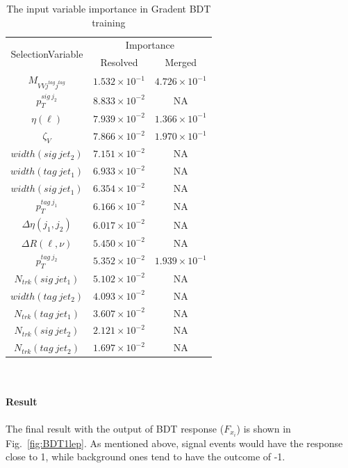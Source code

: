 \begin{table}[h]
	\begin{center}
        \caption{The input variable importance in Gradent BDT training}
		\label{Tab:BDTinput1lepranking}
		\begin{tabular}{|c|c|c|} \hline
		    \multirow{2}{*}{SelectionVariable} & \multicolumn{2}{c|}{Importance}  \\
		    \cline{2-3}
                     &Resolved &  Merged  \\\hline
			$M_{VVj^{tag}j^{tag}}$ & $1.532\times10^{-1}$  & $4.726\times10^{-1}$\\\hline
			$p^{sig\ j_{2}}_{T}$ & $8.833\times10^{-2}$ & NA \\\hline
			$\eta(\ell)$ & $7.939\times10^{-2}$ & $1.366\times10^{-1}$ \\\hline
			$\zeta_{V}$ & $7.866\times10^{-2}$ & $1.970\times10^{-1}$ \\\hline
			$width(sig\ jet_{2})$ & $7.151\times10^{-2}$ & NA \\\hline
			$width(tag\ jet_{1})$ & $6.933\times10^{-2}$ & NA \\\hline
			$width(sig\ jet_{1})$ & $6.354\times10^{-2}$ & NA \\\hline
			$p^{tag\ j_{1}}_{T}$ & $6.166\times10^{-2}$  & NA \\\hline
			$\Delta\eta (j_{1}, j_{2})$ & $6.017\times10^{-2}$ & NA\\\hline
			$\Delta R (\ell,\nu)$ & $5.450\times10^{-2}$ & NA\\\hline
			$p^{tag\ j_{2}}_{T}$ & $5.352\times10^{-2}$  & $1.939\times10^{-1}$ \\\hline
			$N_{trk}(sig\ jet_{1})$ & $5.102\times10^{-2}$ & NA \\\hline
			$width(tag\ jet_{2})$ & $4.093\times10^{-2}$ & NA\\\hline
			$N_{trk}(tag\ jet_{1})$ & $3.607\times10^{-2}$ & NA \\\hline
			$N_{trk}(sig\ jet_{2})$ & $2.121\times10^{-2}$ & NA\\\hline
			$N_{trk}(tag\ jet_{2})$ & $1.697\times10^{-2}$ & NA \\\hline
			\hline
		\end{tabular}
	\end{center}
\end{table}
\noindent
\\
\\{\bf Result}
\\
\\The final result with the output of BDT response ($F_{x_i}$) is shown in Fig.~\ref{fig:BDT1lep}. As mentioned above, signal events would have the response close to 1, while background ones tend to have the outcome of -1. 

